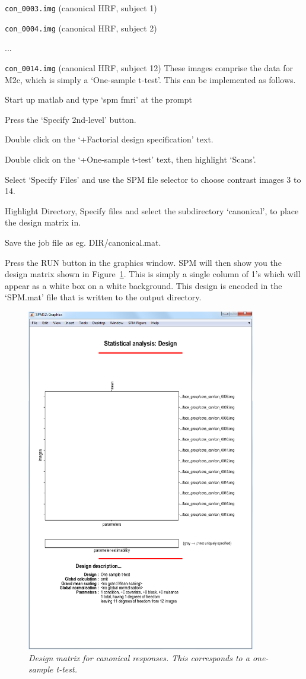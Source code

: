 \bi
\item{\verb!con_0003.img!		(canonical HRF, subject 1)}
\item{\verb!con_0004.img!		(canonical HRF, subject 2)}
\item{...}
\item{\verb!con_0014.img!		(canonical HRF, subject 12)}
\ei
These images comprise the data for M2c, which is simply a `One-sample t-test'. This can be implemented as follows.
\bi
\item{Start up matlab and type `spm fmri' at the prompt}
\item{Press the `Specify 2nd-level' button.}
\item{Double click on the `+Factorial design specification' text.}
\item{Double click on the `+One-sample t-test' text, then highlight `Scans'.} 
\item{Select `Specify Files' and use the SPM file selector
to choose contrast images 3 to 14.}
\item{Highlight Directory, Specify files and select the 
subdirectory `canonical', to place the design matrix in.}
\item{Save the job file as eg. {\sf DIR/canonical.mat}}.
\item{Press the RUN button in the graphics window.}
\ei
SPM will then show you the design matrix shown in Figure~\ref{t1}. This is simply a single column of 1's which will appear as a white box on a white background. This design is encoded in the `SPM.mat' file that is written to the output directory.
\begin{figure}
\begin{center}
\includegraphics[width=100mm]{t1}
\caption{\em Design matrix for canonical responses. This corresponds to a one-sample t-test. \label{t1}}
\end{center}
\end{figure}
